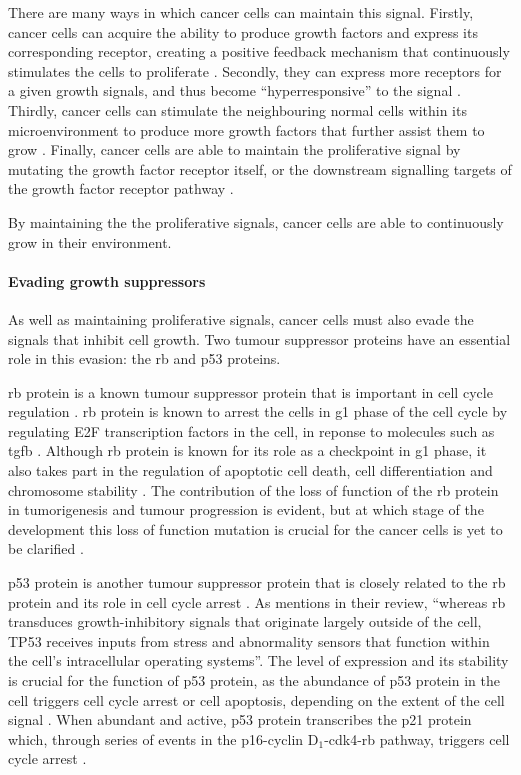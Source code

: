 There are many ways in which cancer cells can maintain this signal.
Firstly, cancer cells can acquire the ability to produce growth factors and express its corresponding receptor, creating a positive feedback mechanism that continuously stimulates the cells to proliferate \citep{Hanahan2000}.
Secondly, they can express more receptors for a given growth signals, and thus become ``hyperresponsive'' to the signal \citep{Hanahan2000,Hanahan2011}.
Thirdly, cancer cells can stimulate the neighbouring normal cells within its microenvironment to produce more growth factors that further assist them to grow \citep{Bhowmick2004, Liotta2001, Wiseman2002}.
Finally, cancer cells are able to maintain the proliferative signal by mutating the growth factor receptor itself, or the downstream signalling targets of the growth factor receptor pathway \citep{Fuqua1991,SuHuang1997,Satyamoorthy2003}.

By maintaining the the proliferative signals, cancer cells are able to continuously grow in their environment.

\paragraph{Evading growth suppressors}

\noindent
As well as maintaining proliferative signals, cancer cells must also evade the signals that inhibit cell growth.
Two tumour suppressor proteins have an essential role in this evasion: the \gls{rb} and p53 proteins.

\Gls{rb} protein is a known tumour suppressor protein that is important in cell cycle regulation \citep{Burkhart2008,Hanahan2011}.
\Gls{rb} protein is known to arrest the cells in \gls{g1} phase of the cell cycle by regulating E2F transcription factors in the cell, in reponse to molecules such as \gls{tgfb} \citep{Burkhart2008,Hanahan2000}.
Although \gls{rb} protein is known for its role as a checkpoint in \gls{g1} phase, it also takes part in the regulation of apoptotic cell death, cell differentiation and chromosome stability \citep{Burkhart2008}.
The contribution of the loss of function of the \gls{rb} protein in tumorigenesis and tumour progression is evident, but at which stage of the development this loss of function mutation is crucial for the cancer cells is yet to be clarified \citep{Burkhart2008}.

p53 protein is another tumour suppressor protein that is closely related to the \gls{rb} protein and its role in cell cycle arrest \citep{Hanahan2011,Levine1997}.
As \citet{Hanahan2011} mentions in their review, ``whereas \gls{rb} transduces growth-inhibitory signals that originate largely outside of the cell, TP53 receives inputs from stress and abnormality sensors that function within the cell's intracellular operating systems''.
The level of expression and its stability is crucial for the function of p53 protein, as the abundance of p53 protein in the cell triggers cell cycle arrest or cell \gls{apoptosis}, depending on the extent of the cell signal \citep{Fridman2003,Hanahan2011,Levine1997}.
When abundant and active, p53 protein transcribes the p21 protein which, through series of events in the p16-cyclin D$_1$-cdk4-\gls{rb} pathway, triggers cell cycle arrest \citep{Levine1997}.

